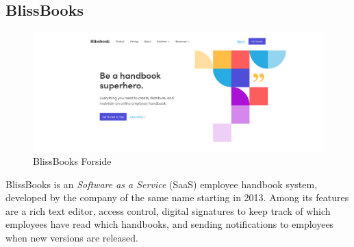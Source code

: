 \subsection{BlissBooks}
\begin{figure}[h]
	\includegraphics[width=1\textwidth]{billeder/BlissBooks.png}
	\caption{BlissBooks Forside}
\end{figure}
BlissBooks is an \textit{Software as a Service} (SaaS) employee handbook system, developed by the company of the same name starting in 2013. %
Among its features are a rich text editor, access control, digital signatures to keep track of which employees have read which handbooks, and sending notifications to employees when new versions are released.
